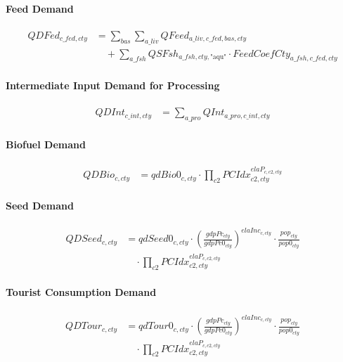 \paragraph{Feed Demand}
\begin{align}
  QDFed_{c\_fed,cty}
  &= \sum_{bas}\sum_{a\_liv} QFeed_{a\_liv,c\_fed,bas,cty}
     \nonumber\\[-0.3em]
  &\quad + \sum_{a\_fsh} QSFsh_{a\_fsh,cty,\text{"aqu"}}\cdot FeedCoefCty_{a\_fsh,c\_fed,cty}
  \tag{QDFedEq}\label{eq:QDFedEq}
\end{align}

\paragraph{Intermediate Input Demand for Processing}
\begin{align}
  QDInt_{c\_int,cty}
  &= \sum_{a\_pro} QInt_{a\_pro,c\_int,cty}
  \tag{QDIntEq}\label{eq:QDIntEq}
\end{align}

\paragraph{Biofuel Demand}
\begin{align}
  QDBio_{c,cty}
  &= qdBio0_{c,cty}
     \cdot
     \prod_{c2}\!
     PCIdx_{c2,cty}^{elaP_{c,c2,cty}}
  \tag{QDBioEq}\label{eq:QDBioEq}
\end{align}

\paragraph{Seed Demand}
\begin{align}
  QDSeed_{c,cty}
  &= qdSeed0_{c,cty}
     \cdot\left(\frac{gdpPc_{cty}}{gdpPc0_{cty}}\right)^{elaInc_{c,cty}}
     \cdot\frac{pop_{cty}}{pop0_{cty}}
     \nonumber\\
  &\quad\cdot\prod_{c2}PCIdx_{c2,cty}^{elaP_{c,c2,cty}}
  \tag{QDSeedEq}\label{eq:QDSeedEq}
\end{align}

\paragraph{Tourist Consumption Demand}
\begin{align}
  QDTour_{c,cty}
  &= qdTour0_{c,cty}
     \cdot\left(\frac{gdpPc_{cty}}{gdpPc0_{cty}}\right)^{elaInc_{c,cty}}
     \cdot\frac{pop_{cty}}{pop0_{cty}}
     \nonumber\\
  &\quad\cdot\prod_{c2}PCIdx_{c2,cty}^{elaP_{c,c2,cty}}
  \tag{QDTourEq}\label{eq:QDTourEq}
\end{align}

